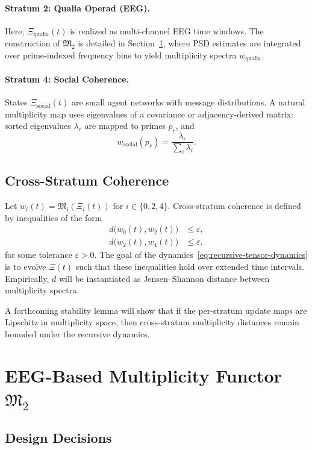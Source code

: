 \documentclass[11pt]{article}
\begin{document}
\paragraph{Stratum 2: Qualia Operad (EEG).}
Here, \(\Xi_{\text{qualia}}(t)\) is realized as multi-channel EEG time windows. The construction of \(\mathfrak{M}_2\) is detailed in Section~\ref{sec:m2-eeg}, where PSD estimates are integrated over prime-indexed frequency bins to yield multiplicity spectra \(w_{\text{qualia}}\).

\paragraph{Stratum 4: Social Coherence.}
States \(\Xi_{\text{social}}(t)\) are small agent networks with message distributions. A natural multiplicity map uses eigenvalues of a covariance or adjacency-derived matrix: sorted eigenvalues \(\lambda_r\) are mapped to primes \(p_r\), and
\[
  w_{\text{social}}(p_r) = \frac{\lambda_r}{\sum_i \lambda_i}.
\]

\subsection{Cross-Stratum Coherence}

Let \(w_i(t) = \mathfrak{M}_i(\Xi_i(t))\) for \(i \in \{0,2,4\}\). Cross-stratum coherence is defined by inequalities of the form
\begin{align}
  d\big(w_0(t), w_2(t)\big) &\leq \varepsilon,\\
  d\big(w_2(t), w_4(t)\big) &\leq \varepsilon,
\end{align}
for some tolerance \(\varepsilon > 0\). The goal of the dynamics~\eqref{eq:recursive-tensor-dynamics} is to evolve \(\Xi(t)\) such that these inequalities hold over extended time intervals. Empirically, \(d\) will be instantiated as Jensen--Shannon distance between multiplicity spectra.

A forthcoming stability lemma will show that if the per-stratum update maps are Lipschitz in multiplicity space, then cross-stratum multiplicity distances remain bounded under the recursive dynamics.

\section{EEG-Based Multiplicity Functor \texorpdfstring{\(\mathfrak{M}_2\)}{M2}}
\label{sec:m2-eeg}

\subsection{Design Decisions}
\end{document}
